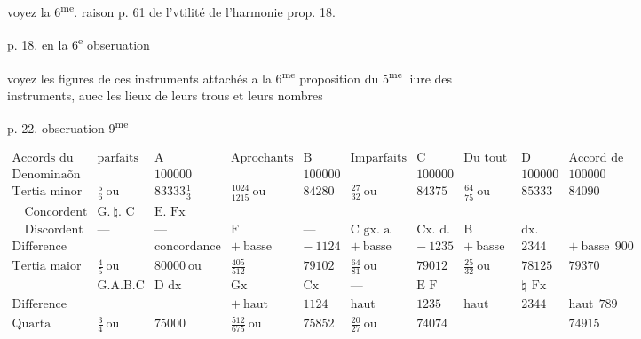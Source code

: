 \documentclass[11pt,a4paper]{article}
\begin{document}
voyez la 6\textsuperscript{me}. raison p. 61 de l'vtilité de l'harmonie prop. 18.

p. 18. en la 6\textsuperscript{e} obseruation

voyez les figures de ces instruments attachés a la 6\textsuperscript{me} proposition du 5\textsuperscript{me} liure des instruments, auec les lieux de leurs trous et leurs nombres


p. 22. obseruation 9\textsuperscript{me}

\[
\begin{array}{l|ll|ll|ll|ll|l}
\text{Accords du monocorde} & \text{parfaits} & \text{A} & \text{Aprochants} & \text{B} & \text{Imparfaits} & \text{C} & \text{Du tout esloignez} & \text{D} & \text{Accord de Ga…} \\
\hline
\text{Denominaõn ou diuision du monocorde en} & & 100000 & & 100000 & & 100000 & & 100000 & 100000 \\
\hline
\text{Tertia minor comprend les} & \frac{5}{6}\ \text{ou} & 83333\frac{1}{3} & \frac{1024}{1215}\ \text{ou} & 84280 & \frac{27}{32}\ \text{ou} & 84375 & \frac{64}{75}\ \text{ou} & 85333 & 84090 \\
\quad\text{Concordent} & \text{G.}\ \natural\text{.\ C} & \text{E. Fx} & & & & & & & \\
\quad\text{Discordent} & \text{---} & \text{---} & \text{F} & \text{---} & \text{C gx. a} & \text{Cx. d.} & \text{B} & \text{dx.} & \\
\text{Difference auec la parfaite} & & \text{concordance} & +\ \text{basse} & -\ 1124 & +\ \text{basse} & -\ 1235 & +\ \text{basse} & 2344 & +\ \text{basse}\ \ 900 \\
\hline
\text{Tertia maior comprend les} & \frac{4}{5}\ \text{ou} & 80000\ \text{ou} & \frac{405}{512} & 79102 & \frac{64}{81}\ \text{ou} & 79012 & \frac{25}{32}\ \text{ou} & 78125 & 79370 \\
 & \text{G.A.B.C} & \text{D dx} & \text{Gx} & \text{Cx} & \text{---} & \text{E F} & & \natural\ \ \text{Fx} & \\
\text{Difference d'auec la parfaite} & & & +\ \text{haut} & 1124 & \text{haut} & 1235 & \text{haut} & 2344 & \text{haut}\ \ 789 \\
\hline
\text{Quarta comprend les} & \frac{3}{4}\ \text{ou} & 75000 & \frac{512}{675}\ \text{ou} & 75852 & \frac{20}{27}\ \text{ou} & 74074 & & & 74915 \\

\end{array}\]
\end{document}
